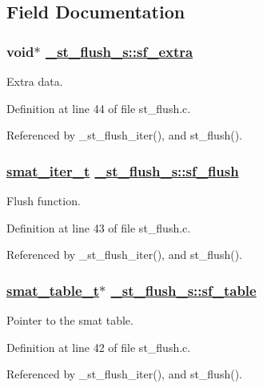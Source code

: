 \subsection{Field Documentation}
\hypertarget{struct__st__flush__s_o2}{
\subsubsection[sf\_\-extra]{\setlength{\rightskip}{0pt plus 5cm}void$\ast$ \hyperlink{struct__st__flush__s_o2}{\_\-st\_\-flush\_\-s::sf\_\-extra}}}
\label{struct__st__flush__s_o2}


Extra data. 

Definition at line 44 of file st\_\-flush.c.

Referenced by \_\-st\_\-flush\_\-iter(), and st\_\-flush().\hypertarget{struct__st__flush__s_o1}{
\subsubsection[sf\_\-flush]{\setlength{\rightskip}{0pt plus 5cm}\hyperlink{group__dbprim__smat_ga4}{smat\_\-iter\_\-t} \hyperlink{struct__st__flush__s_o1}{\_\-st\_\-flush\_\-s::sf\_\-flush}}}
\label{struct__st__flush__s_o1}


Flush function. 

Definition at line 43 of file st\_\-flush.c.

Referenced by \_\-st\_\-flush\_\-iter(), and st\_\-flush().\hypertarget{struct__st__flush__s_o0}{
\subsubsection[sf\_\-table]{\setlength{\rightskip}{0pt plus 5cm}\hyperlink{struct__smat__table__s}{smat\_\-table\_\-t}$\ast$ \hyperlink{struct__st__flush__s_o0}{\_\-st\_\-flush\_\-s::sf\_\-table}}}
\label{struct__st__flush__s_o0}


Pointer to the smat table. 

Definition at line 42 of file st\_\-flush.c.

Referenced by \_\-st\_\-flush\_\-iter(), and st\_\-flush().